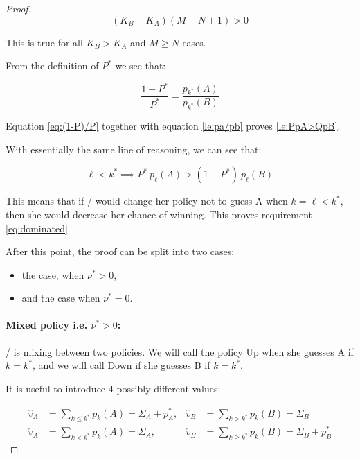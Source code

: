 \documentclass{article}
\theoremstyle{definition}
\begin{document}
\begin{proof}
\begin{equation}
    (K_B - K_A)(M-N+1) > 0
\end{equation}

This is true for all $K_B>K_A$ and $M \ge N$ cases.

From the definition of $P^*$ we see that:

\begin{equation}
    \label{eq:(1-P)/P}
    \frac{1-P^*}{P^*} = \frac{p_{k^*}(A)}{p_{k^*}(B)}
\end{equation}

Equation \eqref{eq:(1-P)/P} together with equation \ref{le:pa/pb} proves \ref{le:PpA>QpB}.

With essentially the same line of reasoning, we can see that:

\begin{equation}
    \label{le:PpA<QpB}
    \ell < k^* \implies P^* \ p_\ell(A) > (1-P^*) \  p_\ell(B)
\end{equation}

This means that if \PI/ would change her policy not to guess A when $k=\ell < k^*$, then she would decrease her chance of winning.
This proves requirement \eqref{eq:dominated}.

After this point, the proof can be split into two cases:

\begin{itemize}
    \item the case, when $\nu^* > 0$,
    \item and the case when $\nu^* = 0$.
\end{itemize}

\paragraph{Mixed policy i.e. $\nu^*>0$:}

\PI/ is mixing between two policies. We will call the policy Up when she guesses A if $k=k^*$, and we will call Down if she guesses B if $k=k^*$.

It is useful to introduce 4 possibly different values:

\begin{align}
    \hat{v}_A   &= \sum_{k \le k^*} p_k(A) = \Sigma_A + p^*_A, & \hat{v}_B   &= \sum_{k > k^*} p_k(B) = \Sigma_B \\
    \check{v}_A &= \sum_{k < k^*} p_k(A) = \Sigma_A,           & \check{v}_B &= \sum_{k \ge k^*} p_k(B) = \Sigma_B + p^*_B
\end{align}



\end{proof}
\end{document}
